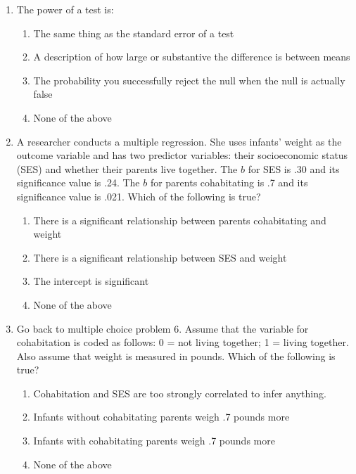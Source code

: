 \documentclass{article}
\begin{document}
\begin{enumerate}[label=\textbf{Q\arabic*:}]
    \item The power of a test is:
    \begin{enumerate}[label=\alph*)]
        \item The same thing as the standard error of a test
        \item A description of how large or substantive the difference is between means
        \item The probability you successfully reject the null when the null is actually false
        \item None of the above
    \end{enumerate}

    \item A researcher conducts a multiple regression. She uses infants’ weight as the outcome variable and has two predictor variables: their socioeconomic status (SES) and whether their parents live together. The $b$ for SES is .30 and its significance value is .24. The $b$ for parents cohabitating is .7 and its significance value is .021. Which of the following is true?
    \begin{enumerate}[label=\alph*)]
        \item There is a significant relationship between parents cohabitating and weight
        \item There is a significant relationship between SES and weight
        \item The intercept is significant
        \item None of the above
    \end{enumerate}

    \item Go back to multiple choice problem 6. Assume that the variable for cohabitation is coded as follows: 0 = not living together; 1 = living together. Also assume that weight is measured in pounds. Which of the following is true?
    \begin{enumerate}[label=\alph*)]
        \item Cohabitation and SES are too strongly correlated to infer anything.
        \item Infants without cohabitating parents weigh .7 pounds more
        \item Infants with cohabitating parents weigh .7 pounds more
        \item None of the above
    \end{enumerate}


\end{enumerate}
\end{document}
